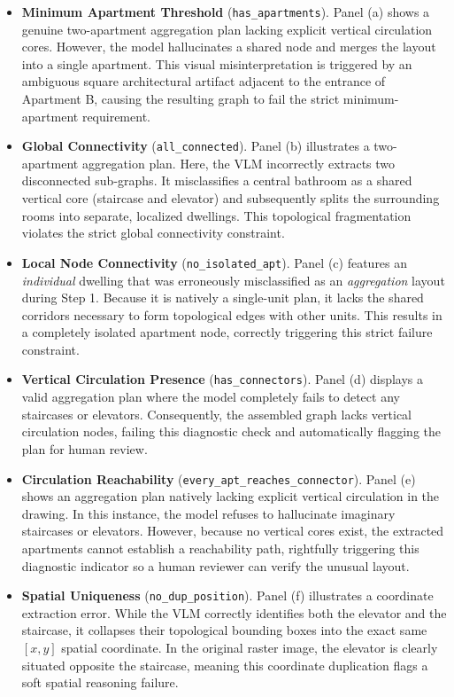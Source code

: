 \documentclass[12pt,a4paper,openright]{report}
\begin{document}
\begin{itemize}
    \item \textbf{Minimum Apartment Threshold} (\texttt{has\_apartments}). Panel (a) shows a genuine two-apartment aggregation plan lacking explicit vertical circulation cores. However, the model hallucinates a shared node and merges the layout into a single apartment. This visual misinterpretation is triggered by an ambiguous square architectural artifact adjacent to the entrance of Apartment B, causing the resulting graph to fail the strict minimum-apartment requirement.

    \item \textbf{Global Connectivity} (\texttt{all\_connected}). Panel (b) illustrates a two-apartment aggregation plan. Here, the VLM incorrectly extracts two disconnected sub-graphs. It misclassifies a central bathroom as a shared vertical core (staircase and elevator) and subsequently splits the surrounding rooms into separate, localized dwellings. This topological fragmentation violates the strict global connectivity constraint.

    \item \textbf{Local Node Connectivity} (\texttt{no\_isolated\_apt}). Panel (c) features an \textit{individual} dwelling that was erroneously misclassified as an \textit{aggregation} layout during Step 1. Because it is natively a single-unit plan, it lacks the shared corridors necessary to form topological edges with other units. This results in a completely isolated apartment node, correctly triggering this strict failure constraint.

    \item \textbf{Vertical Circulation Presence} (\texttt{has\_connectors}). Panel (d) displays a valid aggregation plan where the model completely fails to detect any staircases or elevators. Consequently, the assembled graph lacks vertical circulation nodes, failing this diagnostic check and automatically flagging the plan for human review.
    
    \item \textbf{Circulation Reachability} (\texttt{every\_apt\_reaches\_connector}). Panel (e) shows an aggregation plan natively lacking explicit vertical circulation in the drawing. In this instance, the model refuses to hallucinate imaginary staircases or elevators. However, because no vertical cores exist, the extracted apartments cannot establish a reachability path, rightfully triggering this diagnostic indicator so a human reviewer can verify the unusual layout.
    
    \item \textbf{Spatial Uniqueness} (\texttt{no\_dup\_position}). Panel (f) illustrates a coordinate extraction error. While the VLM correctly identifies both the elevator and the staircase, it collapses their topological bounding boxes into the exact same $[x, y]$ spatial coordinate. In the original raster image, the elevator is clearly situated opposite the staircase, meaning this coordinate duplication flags a soft spatial reasoning failure.

\end{itemize}
\end{document}
